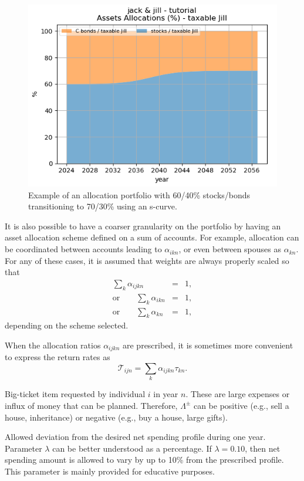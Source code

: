 \documentclass{report}[fleqn,11pt]
\begin{document}
\begin{description}[leftmargin=4em,style=multiline]
	\begin{figure}[t]
	\includegraphics{allocations.png}
		\caption{\small Example of an allocation portfolio with 60/40\% stocks/bonds 
		transitioning to 70/30\% using an s-curve. \label{Fig:allocations}}
	\end{figure}
	It is also possible to have a coarser granularity on the portfolio by
	having an asset allocation scheme
	defined on a sum of accounts. For example, allocation can be coordinated between accounts
	leading to $\alpha_{ikn}$, or even between spouses as $\alpha_{kn}$.
	For any of these cases, it is assumed that weights are always properly scaled so that
	\begin{eqnarray}
		\sum_k \alpha_{ijkn} &=& 1, \nonumber\\
		\text{or} \qquad \sum_k \alpha_{ikn} &=& 1, \nonumber\\
		\text{or} \qquad \sum_k \alpha_{kn} &=& 1,
	\end{eqnarray}
	depending on the scheme selected.

\item[$\mathcal{T}_{ijn}$]
	When the allocation ratios $\alpha_{ijkn}$ are prescribed,
	it is sometimes more convenient to express the return rates as
	\begin{equation}
		\mathcal{T}_{ijn} = \sum_k \alpha_{ijkn} \tau_{kn}.
	\end{equation}

\item [$\Lambda^\pm_{in}$]
	Big-ticket item requested by individual $i$ in year $n$.
	These are large expenses or influx of money
	that can be planned. Therefore, $\Lambda^\pm$ can be positive
	(e.g., sell a house, inheritance) or negative (e.g., buy a house, large gifts).
\item [$\lambda$]
        Allowed deviation from the desired net spending profile during one year. Parameter
        $\lambda$ can be better understood as a percentage. If $\lambda = 0.10$, then net spending
	amount is allowed to vary by up to 10\% from the prescribed profile.
	This parameter is mainly provided for educative purposes.


\end{description}
\end{document}
